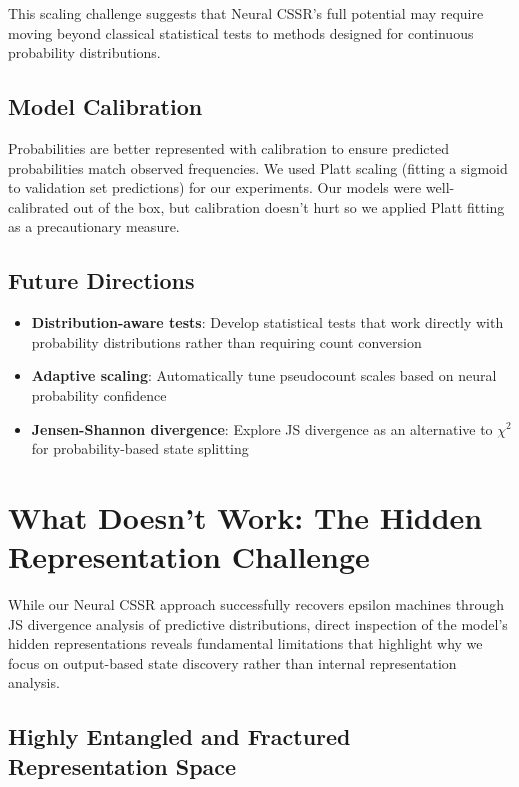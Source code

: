 \documentclass[11pt]{article}
\begin{document}
This scaling challenge suggests that Neural CSSR's full potential may require moving beyond classical statistical tests to methods designed for continuous probability distributions.

\subsection{Model Calibration}

Probabilities are better represented with calibration to ensure predicted probabilities match observed frequencies. We used Platt scaling (fitting a sigmoid to validation set predictions) for our experiments. Our models were well-calibrated out of the box, but calibration doesn't hurt so we applied Platt fitting as a precautionary measure.

\subsection{Future Directions}

\begin{itemize}
\item \textbf{Distribution-aware tests}: Develop statistical tests that work directly with probability distributions rather than requiring count conversion
\item \textbf{Adaptive scaling}: Automatically tune pseudocount scales based on neural probability confidence
\item \textbf{Jensen-Shannon divergence}: Explore JS divergence as an alternative to $\chi^2$ for probability-based state splitting
\end{itemize}

\section{What Doesn't Work: The Hidden Representation Challenge}

While our Neural CSSR approach successfully recovers epsilon machines through JS divergence analysis of predictive distributions, direct inspection of the model's hidden representations reveals fundamental limitations that highlight why we focus on output-based state discovery rather than internal representation analysis.

\subsection{Highly Entangled and Fractured Representation Space}
\end{document}
